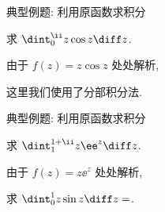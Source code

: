 \begin{frame}{典型例题: 利用原函数求积分}
	\onslide<+->
	\begin{example}[nearnext]
		求 $\dint_0^\ii z\cos z\diff z$.
	\end{example}
	\onslide<+->
	\begin{solution}[nearprev]
		由于 $f(z)=z\cos z$ 处处解析,
		\bigdel
	\end{solution}
	\onslide<+->
	这里我们使用了\alert{分部积分法}.
\end{frame}


\begin{frame}{典型例题: 利用原函数求积分}
	\onslide<+->
	\begin{example}[near]
		求 $\dint_1^{1+\ii} z \ee^z\diff z$.
	\end{example}
	\onslide<+->
	\begin{solution}[nearprev]
		由于 $f(z)=z\ee^z$ 处处解析,
		\bigdel
	\end{solution}
	\onslide<+->
	\begin{exercise}
		求 $\dint_0^1 z\sin z\diff z=$.
	\end{exercise}
\end{frame}


